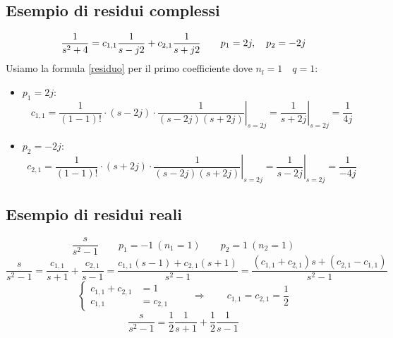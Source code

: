 \documentclass[../main.tex]{subfiles}
\begin{document}
	\subsection{Esempio di residui complessi}
	\[ \frac{1}{s^2+4} = c_{1,1} \frac{1}{s - j 2} + c_{2,1} \frac{1}{s + j 2} \qquad p_1 = 2j,\quad p_2 = -2j\]
	Usiamo la formula \ref{residuo} per il primo coefficiente dove $ n_l = 1 \quad q = 1 $:
	\begin{itemize}
		\item $ p_1 = 2j $:
		\[ 
			c_{1,1} = \left. \frac{1}{(1-1)!} \cdot (s-2j) \cdot \frac{1}{(s-2j)(s+2j)} \right|_{s=2j} = \left. \frac{1}{s+2j} \right|_{s=2j} = \frac{1}{4j}
		\]
		\item $ p_2 = -2j $:
		\[ 
			c_{2,1} = \left. \frac{1}{(1-1)!} \cdot (s+2j) \cdot \frac{1}{(s-2j)(s+2j)} \right|_{s=2j} = \left. \frac{1}{s-2j} \right|_{s=2j} = \frac{1}{-4j}
		\]
	\end{itemize}
	\subsection{Esempio di residui reali}
	\[ \frac{s}{s^2-1} \qquad p_1 = -1\ (n_1 = 1) \qquad p_2 = 1\ (n_2 = 1) \]
	\[ \frac{s}{s^2-1} = \frac{c_{1,1}}{s+1}  + \frac{c_{2,1}}{s-1} = \frac{c_{1,1}(s-1) + c_{2,1}(s+1)}{s^2-1} = \frac{(c_{1,1} + c_{2,1})s + (c_{2,1} - c_{1,1})}{s^2-1} \]
	\[ \begin{cases}
		c_{1,1} + c_{2,1} &= 1\\
		c_{1,1} &= c_{2,1}
	\end{cases}
	\qquad \Rightarrow \qquad c_{1,1} = c_{2,1} = \frac{1}{2} \]
	\[ \frac{s}{s^2-1} = \frac{1}{2} \frac{1}{s+1} + \frac{1}{2} \frac{1}{s-1} \]
\end{document}
